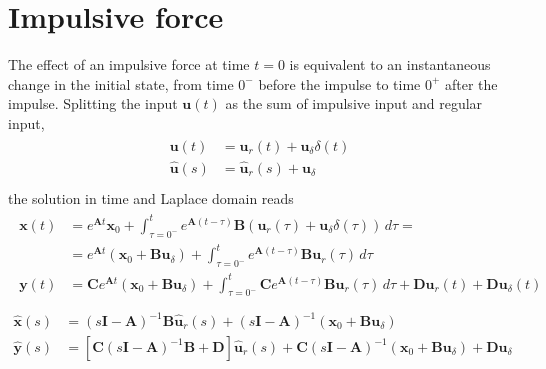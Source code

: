 \documentclass[letterpaper,10pt,english]{jupyterBook}
\begin{document}
\section{Impulsive force}
\label{\detokenize{ch/ode/lti:impulsive-force}}
\sphinxAtStartPar
The effect of an impulsive force at time \(t=0\) is equivalent to an instantaneous change in the initial state, from time \(0^-\) before the impulse to time \(0^+\) after the impulse. Splitting the input \(\mathbf{u}(t)\) as the sum of impulsive input and regular input,
\begin{equation*}
\begin{split}\begin{aligned}
  \mathbf{u}(t) & = \mathbf{u}_r(t) + \mathbf{u}_\delta \delta(t) \\
  \hat{\mathbf{u}}(s) & = \hat{\mathbf{u}}_r(s) + \mathbf{u}_\delta \\
\end{aligned}\end{split}
\end{equation*}
\sphinxAtStartPar
the solution in time and Laplace domain reads
\begin{equation*}
\begin{split}\begin{aligned}
  \mathbf{x}(t)
  & = e^{\mathbf{A}t} \mathbf{x}_0 + \int_{\tau=0^-}^{t} e^{\mathbf{A}(t-\tau)} \mathbf{B} \left( \mathbf{u}_r (\tau) + \mathbf{u}_\delta \delta(\tau) \right) \, d \tau = \\ 
  & = e^{\mathbf{A}t} \left( \mathbf{x}_0 + \mathbf{B} \mathbf{u}_\delta \right) + \int_{\tau=0^-}^{t} e^{\mathbf{A}(t-\tau)} \mathbf{B} \mathbf{u}_r (\tau) \, d \tau \\
  \mathbf{y}(t)
  & = \mathbf{C} e^{\mathbf{A}t} \left( \mathbf{x}_0 + \mathbf{B} \mathbf{u}_\delta \right) + \int_{\tau=0^-}^{t} \mathbf{C} e^{\mathbf{A}(t-\tau)} \mathbf{B} \mathbf{u}_r (\tau) \, d \tau + \mathbf{D} \mathbf{u}_r(t) + \mathbf{D} \mathbf{u}_\delta(t) \\
\end{aligned}\end{split}
\end{equation*}\begin{equation*}
\begin{split}
  \hat{\mathbf{x}}(s) & = (s\mathbf{I} - \mathbf{A})^{-1} \mathbf{B} \hat{\mathbf{u}}_r(s) + (s\mathbf{I} - \mathbf{A})^{-1} \left( \mathbf{x}_0 + \mathbf{B} \mathbf{u}_\delta \right) \\
  \hat{\mathbf{y}}(s) & = \left[ \mathbf{C} (s\mathbf{I} - \mathbf{A})^{-1} \mathbf{B} + \mathbf{D} \right] \hat{\mathbf{u}}_r(s) + \mathbf{C} (s\mathbf{I} - \mathbf{A})^{-1} \left( \mathbf{x}_0 + \mathbf{B} \mathbf{u}_\delta \right) + \mathbf{D} \mathbf{u}_{\delta}
\end{split}
\end{equation*}
\end{document}
